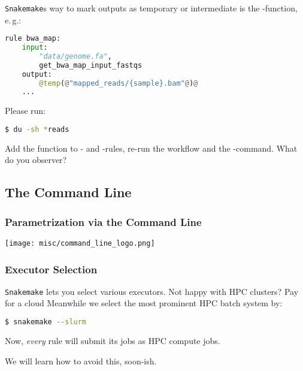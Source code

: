 \begin{frame}[fragile]
  \frametitle{}
  \texttt{Snakemake}s way to mark outputs as temporary or intermediate is the -function, e.\,g.:
  \begin{lstlisting}[language=Python,style=Python]
rule bwa_map:
    input:
        "data/genome.fa",
        get_bwa_map_input_fastqs
    output:
        @temp(@"mapped_reads/{sample}.bam"@)@
    ...
  \end{lstlisting}
  \pause
  Please run:
  \begin{lstlisting}[language=Bash, style=Shell]
$ du -sh *reads
  \end{lstlisting}
  Add the  function to - and -rules, re-run the workflow and the -command. What do you observer?
\end{frame}

\subsection{The Command Line}

\begin{frame}
  \frametitle{Parametrization via the Command Line}
  \centering
  \texttt{[image: misc/command\_line\_logo.png]}
\end{frame}

\begin{frame}[fragile]
  \frametitle{Executor Selection}
  \texttt{Snakemake} lets you select various executors. Not happy with HPC clusters? Pay for a cloud  \newline
  Meanwhile we select the most prominent HPC batch system by:
  \begin{lstlisting}[language=Bash, style=Shell]
$ snakemake --slurm
  \end{lstlisting}
  Now, \emph{every} rule will submit its jobs as HPC compute jobs.
  \begin{hint}
  	We will learn how to avoid this, soon-ish.
  \end{hint}
\end{frame}

